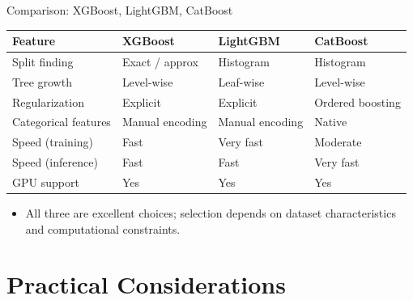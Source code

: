 \begin{frame}{Comparison: XGBoost, LightGBM, CatBoost}
  \renewcommand{\arraystretch}{1.4}
  \begin{center}
  \begin{tabular}{llll}
    \toprule
    \textbf{Feature} & \textbf{XGBoost} & \textbf{LightGBM} & \textbf{CatBoost} \\
    \midrule
    Split finding & Exact / approx & Histogram & Histogram \\
    Tree growth & Level-wise & Leaf-wise & Level-wise \\
    Regularization & Explicit & Explicit & Ordered boosting \\
    Categorical features & Manual encoding & Manual encoding & Native \\
    Speed (training) & Fast & Very fast & Moderate \\
    Speed (inference) & Fast & Fast & Very fast \\
    GPU support & Yes & Yes & Yes \\
    \bottomrule
  \end{tabular}
  \end{center}
  \vspace{0.4em}
  \begin{itemize}
    \item All three are excellent choices; selection depends on dataset characteristics and
          computational constraints.
  \end{itemize}
\end{frame}

\section{Practical Considerations}

